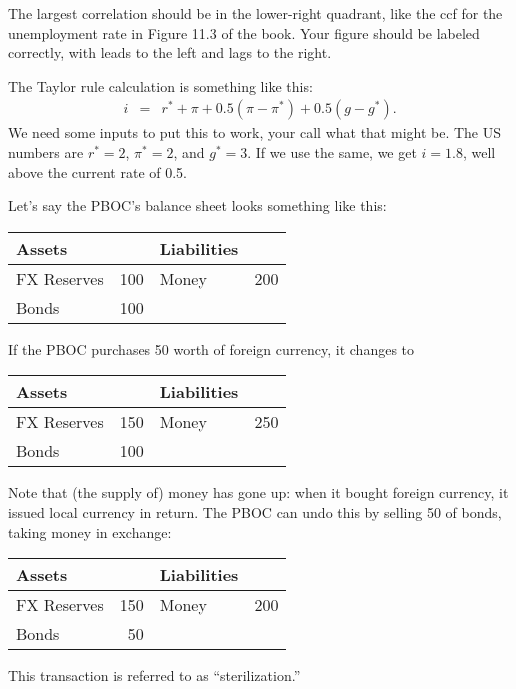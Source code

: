 \documentclass[letterpaper,12pt]{exam}
\begin{document}
\begin{questions}
\begin{solution}
\begin{parts}
\item The largest correlation should be in the lower-right quadrant,
like the ccf for the unemployment rate in Figure 11.3 of the book.
Your figure should be labeled correctly, with leads to the left and
lags to the right.

\item The Taylor rule calculation is something like this:
\begin{eqnarray*}
    i &=& r^* + \pi + 0.5 (\pi - \pi^*) + 0.5 (g - g^*) .
\end{eqnarray*}
We need some inputs to put this to work, your call what that might be.  
The US numbers are
$ r^* = 2$, $\pi^* = 2$, and $g^* = 3$.
If we use the same, we get $i = 1.8$, well above the current rate of 0.5.

\item Let's say the PBOC's balance sheet looks something like this:
%
\begin{center}
\begin{tabular}{lr|lr}
               Assets  &     &     Liabilities                     \\
               \hline
               FX Reserves &  100 &     Money &  200   \\
               Bonds   & 100 & \\
\end{tabular}
\end{center}
%
If the PBOC purchases 50 worth of foreign currency,
it changes to
%
\begin{center}
\begin{tabular}{lr|lr}
               Assets  &     &     Liabilities                     \\
               \hline
               FX Reserves &  150 &     Money  &  250   \\
               Bonds   & 100 & \\
\end{tabular}
\end{center}
%
Note that (the supply of) money has gone up:  when it bought foreign currency,
it issued local currency in return.
The PBOC can undo this by selling 50 of bonds, taking money
in exchange:
%
\begin{center}
\begin{tabular}{lr|lr}
               Assets  &     &     Liabilities                     \\
               \hline
               FX Reserves &  150 &     Money  &  200   \\
               Bonds   & 50 & \\
\end{tabular}
\end{center}
%
This transaction is referred to as ``sterilization.''


\end{parts}
\end{solution}
\end{questions}
\end{document}
